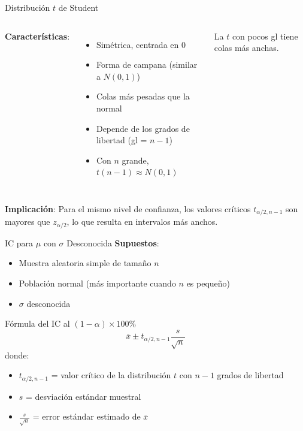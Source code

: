 \documentclass[aspectratio=169, 11pt]{beamer}
\begin{document}
\begin{frame}{Distribución $t$ de Student}
\begin{columns}[T]
\textbf{Características}:
\begin{itemize}
  \item Simétrica, centrada en 0
  \item Forma de campana (similar a $N(0,1)$)
  \item \alert{Colas más pesadas} que la normal
  \item Depende de los grados de libertad (gl = $n-1$)
  \item Con $n$ grande, $t(n-1) \approx N(0,1)$
\end{itemize}


\vspace{0.2cm}
\small La $t$ con pocos gl tiene colas más anchas.
\end{columns}

\vspace{0.3cm}
\textbf{Implicación}: Para el mismo nivel de confianza, los valores críticos $t_{\alpha/2, n-1}$ son \alert{mayores} que $z_{\alpha/2}$, lo que resulta en intervalos \alert{más anchos}.
\end{frame}

\begin{frame}{IC para $\mu$ con $\sigma$ Desconocida}
\textbf{Supuestos}:
\begin{itemize}
  \item Muestra aleatoria simple de tamaño $n$
  \item Población normal (más importante cuando $n$ es pequeño)
  \item $\sigma$ \alert{desconocida}
\end{itemize}

\vspace{0.3cm}
\begin{block}{Fórmula del IC al $(1-\alpha) \times 100\%$}
\[
\bar{x} \pm t_{\alpha/2, n-1} \frac{s}{\sqrt{n}}
\]
donde:
\begin{itemize}
  \item $t_{\alpha/2, n-1}$ = valor crítico de la distribución $t$ con $n-1$ grados de libertad
  \item $s$ = desviación estándar muestral
  \item $\frac{s}{\sqrt{n}}$ = error estándar estimado de $\bar{x}$
\end{itemize}
\end{block}
\end{frame}
\end{document}
